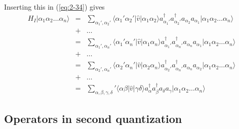 \documentclass[%
twoside,                 %
final,                   %
10pt]{article}
\begin{document}
\paragraph{}
Inserting this in (\ref{eq:2-34}) gives
\begin{eqnarray}
	H_I |\alpha_1\alpha_2\dots\alpha_n\rangle
	&=& \sum_{\alpha_1', \alpha_2'} \langle \alpha_1'\alpha_2'|\hat{v}|\alpha_1\alpha_2\rangle
		a_{\alpha_1'}^{\dagger} a_{\alpha_2'}^{\dagger} a_{\alpha_2} a_{\alpha_1}
		|\alpha_1\alpha_2\dots\alpha_n\rangle \nonumber \\
	&+& \dots \nonumber \\
	&=& \sum_{\alpha_1', \alpha_n'} \langle \alpha_1'\alpha_n'|\hat{v}|\alpha_1\alpha_n\rangle
		a_{\alpha_1'}^{\dagger} a_{\alpha_n'}^{\dagger} a_{\alpha_n} a_{\alpha_1}
		|\alpha_1\alpha_2\dots\alpha_n\rangle \nonumber \\
	&+& \dots \nonumber \\
	&=& \sum_{\alpha_2', \alpha_n'} \langle \alpha_2'\alpha_n'|\hat{v}|\alpha_2\alpha_n\rangle
		a_{\alpha_2'}^{\dagger} a_{\alpha_n'}^{\dagger} a_{\alpha_n} a_{\alpha_2}
		|\alpha_1\alpha_2\dots\alpha_n\rangle \nonumber \\
	&+& \dots \nonumber \\
	&=& \sum_{\alpha, \beta, \gamma, \delta} ' \langle \alpha\beta|\hat{v}|\gamma\delta\rangle
		a^{\dagger}_\alpha a^{\dagger}_\beta a_\delta a_\gamma
		|\alpha_1\alpha_2\dots\alpha_n\rangle \label{eq:2-36}
\end{eqnarray}







\subsection{Operators in second quantization}

\end{document}
